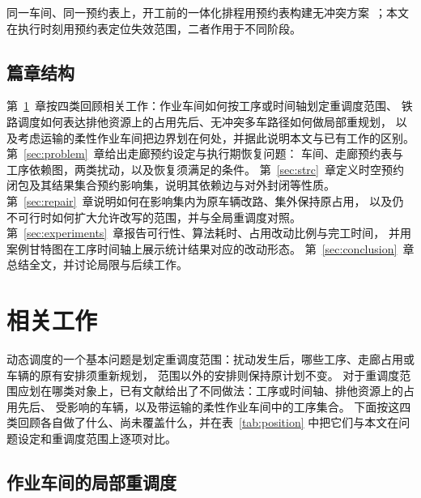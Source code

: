 \documentclass[manuscript,screen,review]{acmart}
\begin{document}
同一车间、同一预约表上，开工前的一体化排程用预约表构建无冲突方案~\cite{vanos2026exact,li2026framework,sun2023integrated}；本文在执行时刻用预约表定位失效范围，二者作用于不同阶段。

\subsection{篇章结构}

第~\ref{sec:related_work}~章按四类回顾相关工作：作业车间如何按工序或时间轴划定重调度范围、
铁路调度如何表达排他资源上的占用先后、无冲突多车路径如何做局部重规划，
以及考虑运输的柔性作业车间把边界划在何处，并据此说明本文与已有工作的区别。
第~\ref{sec:problem}~章给出走廊预约设定与执行期恢复问题：
车间、走廊预约表与工序依赖图，两类扰动，以及恢复须满足的条件。
第~\ref{sec:strc}~章定义时空预约闭包及其结果集合预约影响集，说明其依赖边与对外封闭等性质。
第~\ref{sec:repair}~章说明如何在影响集内为原车辆改路、集外保持原占用，
以及仍不可行时如何扩大允许改写的范围，并与全局重调度对照。
第~\ref{sec:experiments}~章报告可行性、算法耗时、占用改动比例与完工时间，
并用案例甘特图在工序时间轴上展示统计结果对应的改动形态。
第~\ref{sec:conclusion}~章总结全文，并讨论局限与后续工作。

\section{相关工作}
\label{sec:related_work}


动态调度的一个基本问题是划定重调度范围：扰动发生后，哪些工序、走廊占用或车辆的原有安排须重新规划，
范围以外的安排则保持原计划不变。
对于重调度范围应划在哪类对象上，已有文献给出了不同做法：工序或时间轴、排他资源上的占用先后、
受影响的车辆，以及带运输的柔性作业车间中的工序集合。
下面按这四类回顾各自做了什么、尚未覆盖什么，并在表~\ref{tab:position} 中把它们与本文在问题设定和重调度范围上逐项对比。

\subsection{作业车间的局部重调度}
\label{sec:rw_aor}
\end{document}
